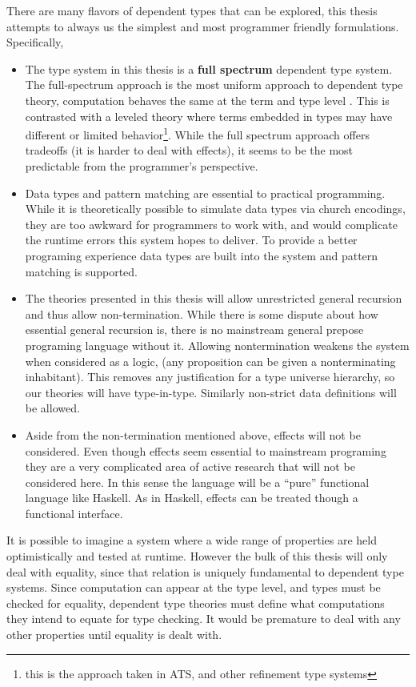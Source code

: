 There are many flavors of dependent types that can be explored, this thesis attempts to always us the simplest and most programmer friendly formulations.
Specifically, 
\begin{itemize}
\item The type system in this thesis is a \textbf{full spectrum} dependent type system.
The full-spectrum approach is the most uniform approach to dependent type theory, computation behaves the same at the term and type level \cite{10.1145/289423.289451,norell2007towards,brady2013idris,sjoberg2012irrelevance}.
This is contrasted with a leveled theory where terms embedded in types may have different or limited behavior\footnote{this is the approach taken in ATS, and other refinement type systems}.
While the full spectrum approach offers tradeoffs (it is harder to deal with effects), it seems to be the most predictable from the programmer's perspective.
\item Data types and pattern matching are essential to practical programming.
While it is theoretically possible to simulate data types via church encodings, they are too awkward for programmers to work with, and would complicate the runtime errors this system hopes to deliver.
To provide a better programing experience data types are built into the system and pattern matching is supported.
\item The theories presented in this thesis will allow unrestricted general recursion and thus allow non-termination.
While there is some dispute about how essential general recursion is, there is no mainstream general prepose programing language without it.
Allowing nontermination weakens the system when considered as a logic, (any proposition can be given a nonterminating inhabitant).
This removes any justification for a type universe hierarchy, so our theories will have type-in-type. Similarly non-strict data definitions will be allowed.
\item Aside from the non-termination mentioned above, effects will not be considered.
Even though effects seem essential to mainstream programing they are a very complicated area of active research that will not be considered here.
In this sense the language will be a ``pure'' functional language like Haskell.
As in Haskell, effects can be treated though a functional interface.
\end{itemize}
It is possible to imagine a system where a wide range of properties are held optimistically and tested at runtime.
However the bulk of this thesis will only deal with equality, since that relation is uniquely fundamental to dependent type systems.
Since computation can appear at the type level, and types must be checked for equality, dependent type theories must define what computations they intend to equate for type checking.
It would be premature to deal with any other properties until equality is dealt with.

